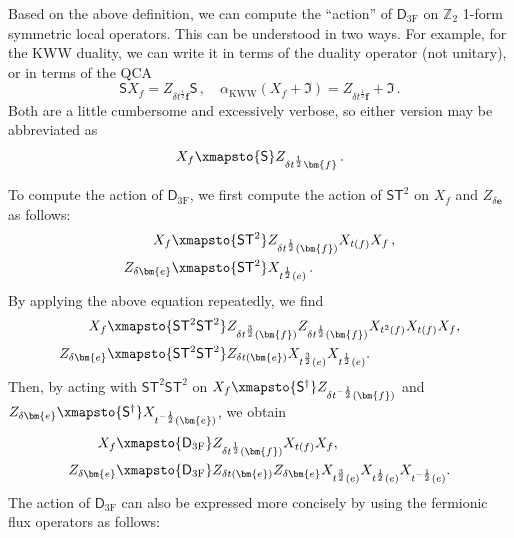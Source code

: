 \documentclass[aps,twocolumn,prx,floatfix,preprintnumbers, nofootinbib,10pt]{revtex4-2}
\numberwithin{equation}{section}
\theoremstyle{definition}
\theoremstyle{remark}
\theoremstyle{claim}
\newcommand{\be}{\begin{equation}}
\newcommand{\ee}{\end{equation}}
\newcommand{\aKWW}{\alpha_\text{KWW}}
\renewcommand{\sf}[1]{\mathsf{#1}}
\begin{document}
Based on the above definition, we can compute the ``action'' of $\mathsf{D}_\text{3F}$ on $\mathbb{Z}_2$ 1-form symmetric local operators. This can be understood in two ways. For example, for the KWW duality, we can write it in terms of the duality operator (not unitary), or in terms of the QCA
\be
\sf{S} X_f = Z_{\delta t^{\frac{1}{2}} \bm{f}} \sf{S} \,, \quad \aKWW(X_f + \mathfrak{I}) = Z_{\delta t^{\frac{1}{2}} \bm{f}} + \mathfrak{I} \,.
\ee
Both are a little cumbersome and excessively verbose, so either version may be abbreviated as
\be
X_f \xmapsto{\sf{S}} Z_{\delta t^{\frac{1}{2}} \bm{f}} \,.
\ee

To compute the action of $\sf{D}_\text{3F}$, we first compute the action of $\sf{S}\sf{T}^2$ on $X_f$ and $Z_{\delta \bm{e}}$ as follows:
\begin{equation}
\begin{aligned}
X_f &\xmapsto{\sf{S}\sf{T}^2} Z_{\delta t^{\frac{1}{2}}(\bm{f})} X_{t(f)} X_f \, , \\
Z_{\delta \bm{e}} &\xmapsto{\sf{S}\sf{T}^2} X_{t^{\frac{1}{2}}(e)} \,.
\end{aligned}
\end{equation}
By applying the above equation repeatedly, we find
\begin{equation}
\begin{aligned}
X_f &\xmapsto{\sf{S}\sf{T}^2\sf{S}\sf{T}^2} Z_{\delta t^{\frac{3}{2}}(\bm{f})} Z_{\delta t^{\frac{1}{2}}(\bm{f})} X_{t^2(f)} X_{t(f)} X_{f}, \\
Z_{\delta \bm{e}} &\xmapsto{\sf{S}\sf{T}^2\sf{S}\sf{T}^2} Z_{\delta t(\bm{e})} X_{t^{\frac{3}{2}}(e)} X_{t^{\frac{1}{2}}(e)}.
\end{aligned}
\end{equation}
Then, by acting with $\sf{S}\sf{T}^2\sf{S}\sf{T}^2$ on $X_f \xmapsto{\sf{S}^\dag} Z_{\delta t^{-\frac{1}{2}} (\bm{f})}$ and $Z_{\delta \bm{e}} \xmapsto{\sf{S}^\dag} X_{t^{-\frac{1}{2}}(\bm{e})}$, we obtain
\begin{equation}
\begin{aligned}
X_f &\xmapsto{\sf{D}_\text{3F}} Z_{\delta t^{\frac{1}{2}}(\bm{f})} X_{t(f)} X_f, \\
Z_{\delta \bm{e}} &\xmapsto{\sf{D}_\text{3F}} Z_{\delta t(\bm{e})} Z_{\delta \bm{e}} X_{t^{\frac{3}{2}}(e)} X_{t^{\frac{1}{2}}(e)} X_{t^{-\frac{1}{2}}(e)}.
\end{aligned}
\end{equation}
The action of $\sf{D}_\text{3F}$ can also be expressed more concisely by using the fermionic flux operators as follows:
\end{document}
